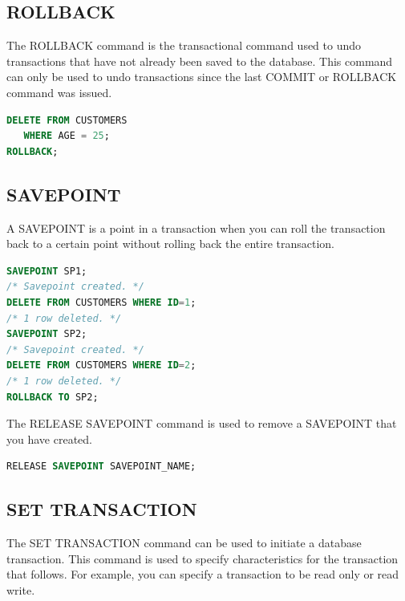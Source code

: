 \documentclass{article}
\begin{document}
\subsection{ROLLBACK}

The ROLLBACK command is the transactional command used to undo transactions that have not already been saved to the database. This command can only be used to undo transactions since the last COMMIT or ROLLBACK command was issued.

\vspace{8pt} \begin{lstlisting}[language=SQL]
DELETE FROM CUSTOMERS
   WHERE AGE = 25;
ROLLBACK;
\end{lstlisting} \vspace{8pt}

\subsection{SAVEPOINT}

A SAVEPOINT is a point in a transaction when you can roll the transaction back to a certain point without rolling back the entire transaction.

\vspace{8pt} \begin{lstlisting}[language=SQL]
SAVEPOINT SP1;
/* Savepoint created. */
DELETE FROM CUSTOMERS WHERE ID=1;
/* 1 row deleted. */
SAVEPOINT SP2;
/* Savepoint created. */
DELETE FROM CUSTOMERS WHERE ID=2;
/* 1 row deleted. */
ROLLBACK TO SP2;
\end{lstlisting} \vspace{8pt}

The RELEASE SAVEPOINT command is used to remove a SAVEPOINT that you have created.

\vspace{8pt} \begin{lstlisting}[language=SQL]
RELEASE SAVEPOINT SAVEPOINT_NAME;
\end{lstlisting} \vspace{8pt}


\subsection{SET TRANSACTION}

The SET TRANSACTION command can be used to initiate a database transaction. This command is used to specify characteristics for the transaction that follows. For example, you can specify a transaction to be read only or read write.
\end{document}
